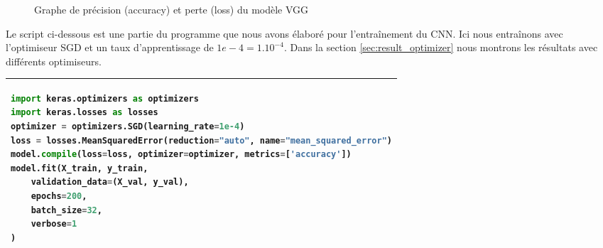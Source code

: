 	\begin{figure}[H]
		\myfloatalign
		 \quad
		
		\caption[]{Graphe de précision (accuracy) et perte (loss) du modèle VGG}\label{fig:adam_curve}
	\end{figure}
	Le script ci-dessous est une partie du programme que nous avons élaboré pour l'entraînement du CNN. Ici nous entraînons avec l'optimiseur SGD et un taux d'apprentissage de $1e-4 = 1.10^{-4}$. Dans la section \ref{sec:result_optimizer} nous montrons les résultats avec différents optimiseurs.
	
\begin{table}[H]
\begin{tabular}{|p{\textwidth}|}
	\hline
	\begin{lstlisting}[language=python]
import keras.optimizers as optimizers
import keras.losses as losses
optimizer = optimizers.SGD(learning_rate=1e-4)
loss = losses.MeanSquaredError(reduction="auto", name="mean_squared_error")
model.compile(loss=loss, optimizer=optimizer, metrics=['accuracy'])
model.fit(X_train, y_train, 
	validation_data=(X_val, y_val), 
	epochs=200, 
	batch_size=32, 
	verbose=1
)
	\end{lstlisting}\\
	\hline
\end{tabular}
\end{table}



